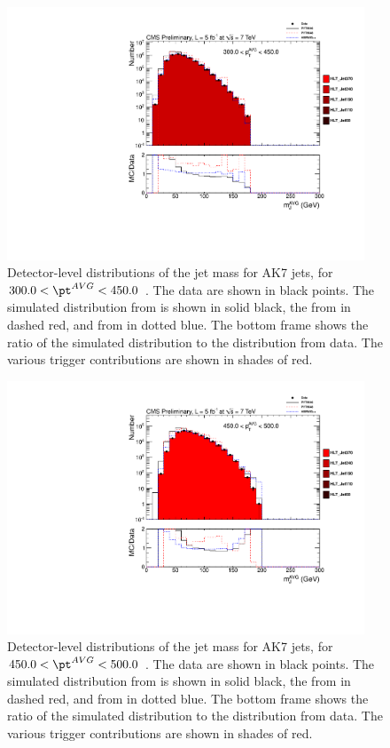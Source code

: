 \begin{figure}[htbp]
\centering
\includegraphics[width=0.95\textwidth]{figs/histAK7MjetVsPtAvg_rawDataMCComparisons_stacktrigs_pt_5}
\caption{Detector-level distributions of the jet mass for AK7 jets,
for $300.0 < \pt^{AVG} < 450.0$ \GeVc. The data are shown in black points.
The simulated distribution from \PYTHIA is shown in solid black, 
the from \PYTHIAEIGHT in dashed red, and from \HERWIG in dotted blue. 
The bottom frame shows the ratio of the simulated distribution
to the distribution from data. The various trigger contributions are shown in shades of red.
\label{figs:histAK7MjetVsPtAvg_rawDataMCComparisons_stacktrigs_pt_5}}
\end{figure}



\begin{figure}[htbp]
\centering
\includegraphics[width=0.95\textwidth]{figs/histAK7MjetVsPtAvg_rawDataMCComparisons_stacktrigs_pt_6}
\caption{Detector-level distributions of the jet mass for AK7 jets,
for $450.0 < \pt^{AVG} < 500.0$ \GeVc. The data are shown in black points.
The simulated distribution from \PYTHIA is shown in solid black, 
the from \PYTHIAEIGHT in dashed red, and from \HERWIG in dotted blue. 
The bottom frame shows the ratio of the simulated distribution
to the distribution from data. The various trigger contributions are shown in shades of red.
\label{figs:histAK7MjetVsPtAvg_rawDataMCComparisons_stacktrigs_pt_6}}
\end{figure}



